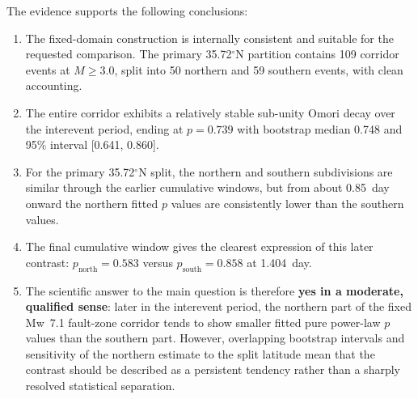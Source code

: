 \documentclass[11pt]{article}
\begin{document}
The evidence supports the following conclusions:
\begin{enumerate}[leftmargin=2em]
    \item The fixed-domain construction is internally consistent and suitable for the requested comparison. The primary 35.72$^{\circ}$N partition contains 109 corridor events at $M \geq 3.0$, split into 50 northern and 59 southern events, with clean accounting.
    \item The entire corridor exhibits a relatively stable sub-unity Omori decay over the interevent period, ending at $p=0.739$ with bootstrap median 0.748 and 95\% interval [0.641, 0.860].
    \item For the primary 35.72$^{\circ}$N split, the northern and southern subdivisions are similar through the earlier cumulative windows, but from about 0.85~day onward the northern fitted $p$ values are consistently lower than the southern values.
    \item The final cumulative window gives the clearest expression of this later contrast: $p_{\mathrm{north}}=0.583$ versus $p_{\mathrm{south}}=0.858$ at 1.404~day.
    \item The scientific answer to the main question is therefore \textbf{yes in a moderate, qualified sense}: later in the interevent period, the northern part of the fixed Mw~7.1 fault-zone corridor tends to show smaller fitted pure power-law $p$ values than the southern part. However, overlapping bootstrap intervals and sensitivity of the northern estimate to the split latitude mean that the contrast should be described as a persistent tendency rather than a sharply resolved statistical separation.
\end{enumerate}
\end{document}

